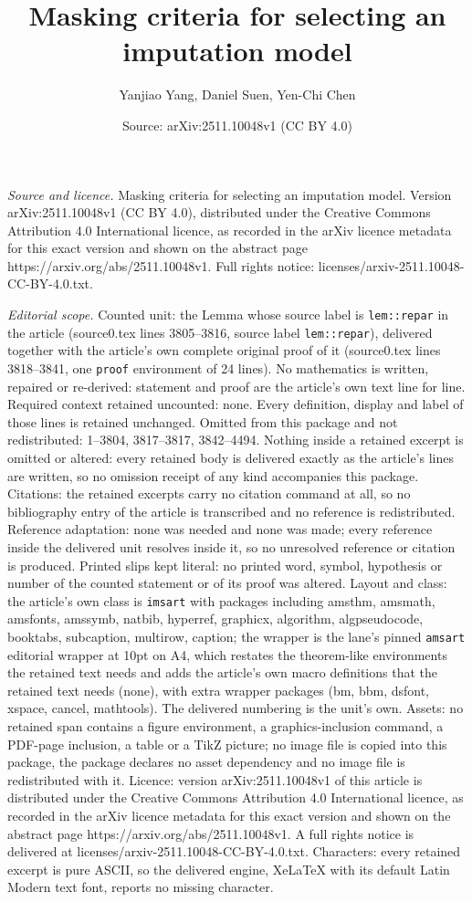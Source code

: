 \documentclass[10pt,a4paper]{amsart}
\title[Masking criteria for selecting an imputation model]{Masking criteria for selecting an imputation model}
\author{Yanjiao Yang, Daniel Suen, Yen-Chi Chen}
\date{Source: arXiv:2511.10048v1 (CC BY 4.0)}
\begin{document}
\maketitle

\noindent\emph{Source and licence.} Masking criteria for selecting an imputation model. Version arXiv:2511.10048v1 (CC BY 4.0), distributed under the Creative Commons Attribution 4.0 International licence, as recorded in the arXiv licence metadata for this exact version and shown on the abstract page https://arxiv.org/abs/2511.10048v1. Full rights notice: licenses/arxiv-2511.10048-CC-BY-4.0.txt.\par\smallskip

\noindent\textit{Editorial scope.} Counted unit: the Lemma whose source label is \texttt{lem::repar} in the article (source0.tex lines 3805--3816, source label \texttt{lem::repar}), delivered together with the article's own complete original proof of it (source0.tex lines 3818--3841, one \texttt{proof} environment of 24 lines). No mathematics is written, repaired or re-derived: statement and proof are the article's own text line for line. Required context retained uncounted: none. Every definition, display and label of those lines is retained unchanged. Omitted from this package and not redistributed: 1--3804, 3817--3817, 3842--4494. Nothing inside a retained excerpt is omitted or altered: every retained body is delivered exactly as the article's lines are written, so no omission receipt of any kind accompanies this package. Citations: the retained excerpts carry no citation command at all, so no bibliography entry of the article is transcribed and no reference is redistributed. Reference adaptation: none was needed and none was made; every reference inside the delivered unit resolves inside it, so no unresolved reference or citation is produced. Printed slips kept literal: no printed word, symbol, hypothesis or number of the counted statement or of its proof was altered. Layout and class: the article's own class is \texttt{imsart} with packages including amsthm, amsmath, amsfonts, amssymb, natbib, hyperref, graphicx, algorithm, algpseudocode, booktabs, subcaption, multirow, caption; the wrapper is the lane's pinned \texttt{amsart} editorial wrapper at 10pt on A4, which restates the theorem-like environments the retained text needs and adds the article's own macro definitions that the retained text needs (none), with extra wrapper packages (bm, bbm, dsfont, xspace, cancel, mathtools). The delivered numbering is the unit's own. Assets: no retained span contains a figure environment, a graphics-inclusion command, a PDF-page inclusion, a table or a TikZ picture; no image file is copied into this package, the package declares no asset dependency and no image file is redistributed with it. Licence: version arXiv:2511.10048v1 of this article is distributed under the Creative Commons Attribution 4.0 International licence, as recorded in the arXiv licence metadata for this exact version and shown on the abstract page https://arxiv.org/abs/2511.10048v1. A full rights notice is delivered at licenses/arxiv-2511.10048-CC-BY-4.0.txt. Characters: every retained excerpt is pure ASCII, so the delivered engine, XeLaTeX with its default Latin Modern text font, reports no missing character.
\end{document}
